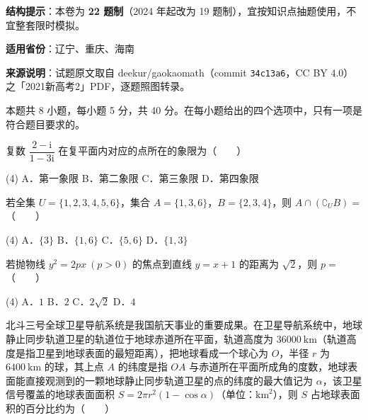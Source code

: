 

\begin{gknotice}
\textbf{结构提示}：本卷为 \textbf{22 题制}（2024 年起改为 19 题制），宜按知识点抽题使用，不宜整套限时模拟。

\textbf{适用省份}：辽宁、重庆、海南

\textbf{来源说明}：试题原文取自 deekur/gaokaomath（commit \texttt{34c13a6}，CC BY 4.0）之「2021新高考2」PDF，逐题照图转录。
\end{gknotice}

\par\medskip


\begin{gktip}
本题共 8 小题，每小题 5 分，共 40 分。在每小题给出的四个选项中，只有一项是符合题目要求的。
\end{gktip}

复数 $\dfrac{2-\mathrm i}{1-3\mathrm i}$ 在复平面内对应的点所在的象限为（　　）

\begin{gkopts}(4)
\task A．第一象限
\task B．第二象限
\task C．第三象限
\task D．第四象限
\end{gkopts}

若全集 $U=\{1,2,3,4,5,6\}$，集合 $A=\{1,3,6\}$，$B=\{2,3,4\}$，则 $A\cap\left(\complement_U B\right)=$（　　）

\begin{gkopts}(4)
\task A．$\{3\}$
\task B．$\{1,6\}$
\task C．$\{5,6\}$
\task D．$\{1,3\}$
\end{gkopts}

若抛物线 $y^{2}=2px\ (p>0)$ 的焦点到直线 $y=x+1$ 的距离为 $\sqrt2$，则 $p=$（　　）

\begin{gkopts}(4)
\task A．$1$
\task B．$2$
\task C．$2\sqrt2$
\task D．$4$
\end{gkopts}

北斗三号全球卫星导航系统是我国航天事业的重要成果。在卫星导航系统中，地球静止同步轨道卫星的轨道位于地球赤道所在平面，轨道高度为 $36000\ \mathrm{km}$（轨道高度是指卫星到地球表面的最短距离），把地球看成一个球心为 $O$，半径 $r$ 为 $6400\ \mathrm{km}$ 的球，其上点 $A$ 的纬度是指 $OA$ 与赤道所在平面所成角的度数，地球表面能直接观测到的一颗地球静止同步轨道卫星的点的纬度的最大值记为 $\alpha$，该卫星信号覆盖的地球表面面积 $S=2\pi r^{2}(1-\cos\alpha)$（单位：$\mathrm{km}^{2}$），则 $S$ 占地球表面积的百分比约为（　　）

